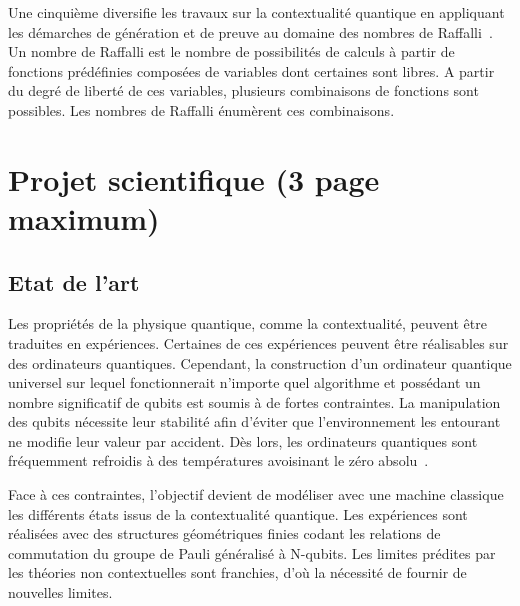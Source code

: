\documentclass[10pt, a4paper, french]{article}
\begin{document}
Une cinquième diversifie les travaux sur la contextualité quantique en appliquant les démarches de génération et de preuve au domaine des nombres de Raffalli~\cite{david2013asymptotically}. Un nombre de Raffalli est le nombre de possibilités de calculs à partir de fonctions prédéfinies composées de variables dont certaines sont libres. A partir du degré de liberté de ces variables, plusieurs combinaisons de fonctions sont possibles. Les nombres de Raffalli énumèrent ces combinaisons.



\newpage

\section{Projet scientifique (3 page maximum)}



\subsection{Etat de l'art}


Les propriétés de la physique quantique, comme la contextualité, peuvent être traduites en expériences. Certaines de ces expériences peuvent être réalisables sur des ordinateurs quantiques. Cependant, la construction d'un ordinateur quantique universel sur lequel fonctionnerait n’importe quel algorithme et possédant un nombre significatif de qubits est soumis à de fortes contraintes.
La manipulation des qubits nécessite leur stabilité afin d'éviter que l'environnement les entourant ne modifie leur valeur par accident.
Dès lors, les ordinateurs quantiques sont fréquemment refroidis à des températures avoisinant le zéro absolu~\cite{holweck2021}.

Face à ces contraintes, l'objectif devient de modéliser avec une machine classique les différents états issus de la contextualité quantique. 
Les expériences sont réalisées avec des structures géométriques finies codant les relations de commutation du groupe de Pauli généralisé à N-qubits. Les limites prédites par les théories non contextuelles sont franchies, d'où la nécessité de fournir de nouvelles limites. 
\end{document}
